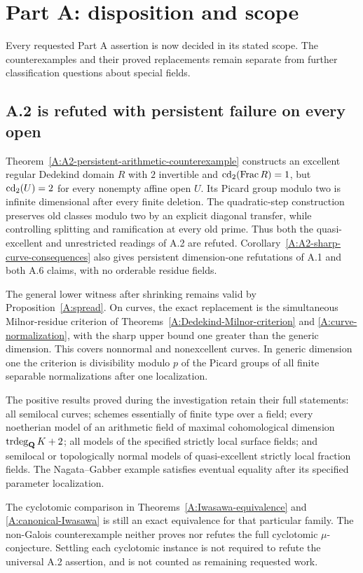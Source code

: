 \section{Part A: disposition and scope}
\label{A:unresolved}
Every requested Part A assertion is now decided in its stated
scope. The counterexamples and their proved replacements remain
separate from further classification questions about special fields.

\subsection{A.2 is refuted with persistent failure on every open}
Theorem~\ref{A:A2-persistent-arithmetic-counterexample} constructs
an excellent regular Dedekind domain $R$ with $2$ invertible and
$\operatorname{cd}_2(\operatorname{Frac} R)=1$, but $\operatorname{cd}_2(U)=2$ for every nonempty affine
open $U$. Its Picard group modulo two is infinite dimensional
after every finite deletion. The quadratic-step construction
preserves old classes modulo two by an explicit diagonal transfer,
while controlling splitting and ramification at every old prime.
Thus both the quasi-excellent and unrestricted readings of A.2
are refuted. Corollary~\ref{A:A2-sharp-curve-consequences} also
gives persistent dimension-one refutations of A.1 and both A.6
claims, with no orderable residue fields.

The general lower witness after shrinking remains valid by
Proposition~\ref{A:spread}. On curves, the exact replacement is
the simultaneous Milnor-residue criterion of
Theorems~\ref{A:Dedekind-Milnor-criterion} and
\ref{A:curve-normalization}, with the sharp upper bound one
greater than the generic dimension. This covers nonnormal and
nonexcellent curves. In generic dimension one the criterion is
divisibility modulo $p$ of the Picard groups of all finite
separable normalizations after one localization.

The positive results proved during the investigation retain their
full statements: all semilocal curves; schemes essentially of
finite type over a field; every noetherian model of an arithmetic
field of maximal cohomological dimension
$\operatorname{trdeg}_{\mathbf Q}K+2$; all models of the specified
strictly local surface fields; and semilocal or topologically
normal models of quasi-excellent strictly local fraction fields.
The Nagata--Gabber example satisfies eventual equality after its
specified parameter localization.

The cyclotomic comparison in
Theorems~\ref{A:Iwasawa-equivalence} and
\ref{A:canonical-Iwasawa} is still an exact equivalence for that
particular family. The non-Galois counterexample neither proves
nor refutes the full cyclotomic $\mu$-conjecture. Settling each
cyclotomic instance is not required to refute the universal A.2
assertion, and is not counted as remaining requested work.

